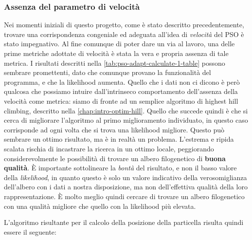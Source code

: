 \subsubsection{Assenza del parametro di velocità}
\label{chap:pso-adapt-calculate-1}
Nei momenti iniziali di questo progetto, come è stato descritto precedentemente, trovare una corrispondenza congeniale ed adeguata all'idea di \textit{velocità} del PSO è stato impegnativo. Al fine comunque di poter dare un via al lavoro, una delle prime metriche adottate di velocità è stata la vera e propria assenza di tale metrica. I risultati descritti nella \autoref{tab:pso-adapt-calculate-1-table} possono sembrare promettenti, dato che comunque provano la funzionalità del programma, e che la likelihood aumenta. Quello che i dati non ci dicono è però qualcosa che possiamo intuire dall'intrinseco comportamento dell'assenza della velocità come metrica: siamo di fronte ad un semplice algoritmo di highest hill climbing, descritto nella \autoref{chap:intro-optim-hill}. Quello che succede quindi è che si cerca di migliorare l'algoritmo al primo miglioramento individuato, in questo caso corrisponde ad ogni volta che si trova una likelihood migliore. Questo può sembrare un ottimo risultato, ma è in realtà un problema. L'estrema e ripida scalata rischia di incastrare la ricerca in un ottimo locale, peggiorando considerevolmente le possibilità di trovare un albero filogenetico di \textbf{buona qualità}. È importante sottolineare la \textit{bontà} del risultato, e non il basso valore della \textit{likelihood}, in quanto questo è solo un valore indicativo della verosomiglianza dell'albero con i dati a nostra disposizione, ma non dell'effettiva qualità della loro rappresentazione. È molto meglio quindi cercare di trovare un albero filogenetico con una qualità migliore che quello con la likelihood più elevata.

L'algoritmo risultante per il calcolo della posizione della particella risulta quindi essere il seguente:

